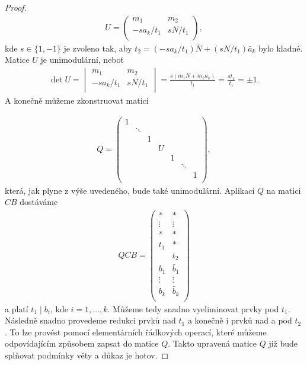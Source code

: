 \begin{proof}
\begin{align*}
U =
    \begin{pmatrix}
        m_1         & m_2      \\
        -sa_k / t_1 & sN / t_1 \\
    \end{pmatrix}
,
\end{align*}
kde $ s \in \{1, -1\} $ je zvoleno tak, aby
$ t_2 = (-sa_k / t_1) \bar{N} + (sN / t_1) \bar{a}_k $ bylo kladné. Matice $ U $
je unimodulární, neboť
\begin{align*}
\det U =
    \begin{vmatrix}
        m_1         & m_2      \\
        -sa_k / t_1 & sN / t_1 \\
    \end{vmatrix}
    = \frac{s(m_1 N + m_2 a_k)}{t_1} = \frac{s t_1}{t_1} = \pm 1
.
\end{align*}
A konečně můžeme zkonstruovat matici

\begin{align*}
Q =
    \begin{pmatrix}
        1 &        &   &   &   &        &   \\
          & \ddots &   &   &   &        &   \\
          &        & 1 &   &   &        &   \\
          &        &   & U &   &        &   \\
          &        &   &   & 1 &        &   \\
          &        &   &   &   & \ddots &   \\
          &        &   &   &   &        & 1 \\
    \end{pmatrix}
,
\end{align*}
která, jak plyne z výše uvedeného, bude také unimodulární. Aplikací $ Q $ na matici
$ CB $ dostáváme
\begin{align*}
QCB =
    \begin{pmatrix}
        \ast   & \ast      \\
        \vdots & \vdots    \\
        \ast   & \ast      \\
        t_1    & \ast      \\
               & t_2       \\
        b_1    & \bar{b}_1 \\
        \vdots & \vdots    \\
        b_k    & \bar{b}_k \\
    \end{pmatrix}
\end{align*}
a platí $ t_1 \mid b_i$, kde $ i = 1, \dots, k $. Můžeme tedy snadno vyeliminovat
prvky pod $ t_1 $. Následně snadno provedeme redukci prvků nad $ t_1 $ a
konečně i prvků nad a pod $ t_2 $. To lze provést pomocí elementárních řádkových
operací, které můžeme odpovídajícím způsobem zapsat do matice $ Q $. Takto
upravená matice $ Q $ již bude splňovat podmínky věty a důkaz je hotov.

\end{proof}




